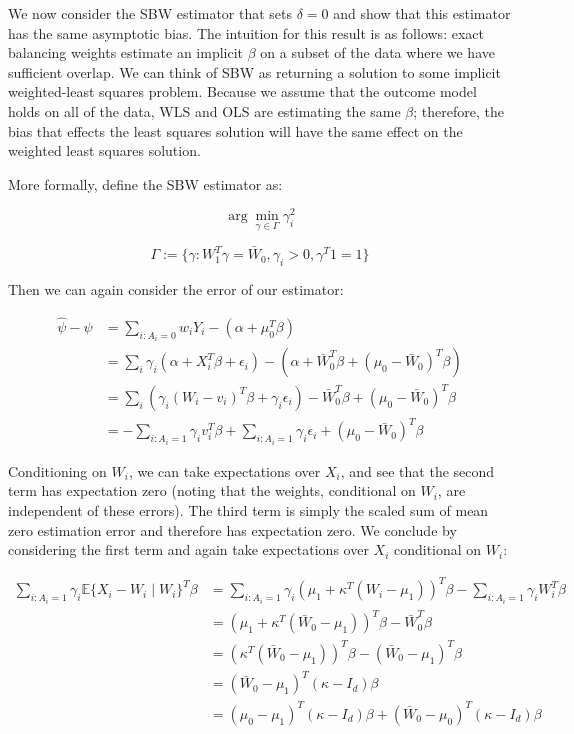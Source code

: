 \documentclass[12pt]{article}
\begin{document}
We now consider the SBW estimator that sets $\delta = 0$ and show that this estimator has the same asymptotic bias. The intuition for this result is as follows: exact balancing weights estimate an implicit $\beta$ on a subset of the data where we have sufficient overlap. We can think of SBW as returning a solution to some implicit weighted-least squares problem. Because we assume that the outcome model holds on all of the data, WLS and OLS are estimating the same $\beta$; therefore, the bias that effects the least squares solution will have the same effect on the weighted least squares solution.

More formally, define the SBW estimator as:

$$
\arg\min_{\gamma \in \Gamma} \gamma_i^2
$$

$$
\Gamma := \{\gamma: W_1^T\gamma = \bar{W}_0, \gamma_i > 0, \gamma^T1 = 1\}
$$

Then we can again consider the error of our estimator:

\begin{align*}
    \hat{\psi} - \psi &= \sum_{i: A_i = 0}w_iY_i - (\alpha + \mu_0^T\beta) \\
    &= \sum_i \gamma_i(\alpha + X_i^T\beta + \epsilon_i) - (\alpha + \bar{W}_0^T\beta + (\mu_0 - \bar{W}_0)^T\beta) \\
    &= \sum_i (\gamma_i(W_i - v_i)^T\beta + \gamma_i\epsilon_i) - \bar{W}_0^T\beta + (\mu_0 - \bar{W}_0)^T\beta \\
    &= -\sum_{i: A_i = 1}\gamma_iv_i^T\beta + \sum_{i: A_i = 1}\gamma_i\epsilon_i  + (\mu_0 - \bar{W}_0)^T\beta
\end{align*}

Conditioning on $W_i$, we can take expectations over $X_i$, and see that the second term has expectation zero (noting that the weights, conditional on $W_i$, are independent of these errors). The third term is simply the scaled sum of mean zero estimation error and therefore has expectation zero. We conclude by considering the first term and again take expectations over $X_i$ conditional on $W_i$: 

\begin{align*}
    \sum_{i: A_i = 1} \gamma_i\mathbb{E}\{X_i - W_i \mid W_i\}^T\beta &= \sum_{i: A_i = 1} \gamma_i (\mu_1 + \kappa^T(W_i - \mu_1))^T\beta - \sum_{i: A_i = 1}\gamma_i W_i^T\beta \\
    &= (\mu_1 + \kappa^T(\bar{W}_0 - \mu_1))^T\beta - \bar{W}_0^T\beta \\
    &= (\kappa^T(\bar{W}_0 - \mu_1))^T\beta - (\bar{W}_0 - \mu_1)^T\beta  \\
    &= (\bar{W}_0 - \mu_1)^T(\kappa - I_d)\beta \\
    &= (\mu_0 - \mu_1)^T(\kappa - I_d)\beta + (\bar{W}_0 - \mu_0)^T(\kappa - I_d)\beta \\
\end{align*}
\end{document}
